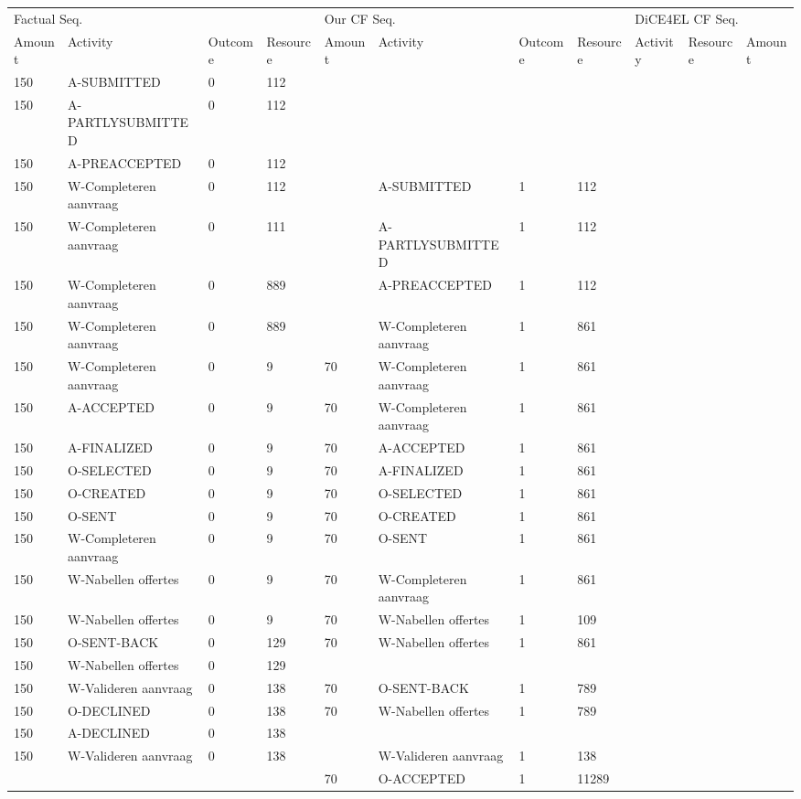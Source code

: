 \begin{tabular}{lllllllllll}
\toprule
\multicolumn{4}{l}{Factual Seq.} & \multicolumn{4}{l}{Our CF Seq.} & \multicolumn{3}{l}{DiCE4EL CF Seq.} \\
Amount & Activity & Outcome & Resource & Amount & Activity & Outcome & Resource & Activity & Resource & Amount \\
\midrule
150 & A-SUBMITTED & 0 & 112 &  &  &  &  &  &  &  \\
150 & A-PARTLYSUBMITTED & 0 & 112 &  &  &  &  &  &  &  \\
150 & A-PREACCEPTED & 0 & 112 &  &  &  &  &  &  &  \\
150 & W-Completeren aanvraag & 0 & 112 &  & A-SUBMITTED & 1 & 112 &  &  &  \\
150 & W-Completeren aanvraag & 0 & 111 &  & A-PARTLYSUBMITTED & 1 & 112 &  &  &  \\
150 & W-Completeren aanvraag & 0 & 889 &  & A-PREACCEPTED & 1 & 112 &  &  &  \\
150 & W-Completeren aanvraag & 0 & 889 &  & W-Completeren aanvraag & 1 & 861 &  &  &  \\
150 & W-Completeren aanvraag & 0 & 9 & 70 & W-Completeren aanvraag & 1 & 861 &  &  &  \\
150 & A-ACCEPTED & 0 & 9 & 70 & W-Completeren aanvraag & 1 & 861 &  &  &  \\
150 & A-FINALIZED & 0 & 9 & 70 & A-ACCEPTED & 1 & 861 &  &  &  \\
150 & O-SELECTED & 0 & 9 & 70 & A-FINALIZED & 1 & 861 &  &  &  \\
150 & O-CREATED & 0 & 9 & 70 & O-SELECTED & 1 & 861 &  &  &  \\
150 & O-SENT & 0 & 9 & 70 & O-CREATED & 1 & 861 &  &  &  \\
150 & W-Completeren aanvraag & 0 & 9 & 70 & O-SENT & 1 & 861 &  &  &  \\
150 & W-Nabellen offertes & 0 & 9 & 70 & W-Completeren aanvraag & 1 & 861 &  &  &  \\
150 & W-Nabellen offertes & 0 & 9 & 70 & W-Nabellen offertes & 1 & 109 &  &  &  \\
150 & O-SENT-BACK & 0 & 129 & 70 & W-Nabellen offertes & 1 & 861 &  &  &  \\
150 & W-Nabellen offertes & 0 & 129 &  &  &  &  &  &  &  \\
150 & W-Valideren aanvraag & 0 & 138 & 70 & O-SENT-BACK & 1 & 789 &  &  &  \\
150 & O-DECLINED & 0 & 138 & 70 & W-Nabellen offertes & 1 & 789 &  &  &  \\
150 & A-DECLINED & 0 & 138 &  &  &  &  &  &  &  \\
150 & W-Valideren aanvraag & 0 & 138 &  & W-Valideren aanvraag & 1 & 138 &  &  &  \\
 &  &  &  & 70 & O-ACCEPTED & 1 & 11289 &  &  &  \\
\bottomrule
\end{tabular}
